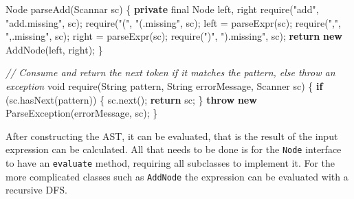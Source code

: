 \documentclass[
]{book}
\newenvironment{Shaded}{\begin{snugshade}}{\end{snugshade}}
\newcommand{\BuiltInTok}[1]{#1}
\newcommand{\CommentTok}[1]{\textcolor[rgb]{0.56,0.35,0.01}{\textit{#1}}}
\newcommand{\DataTypeTok}[1]{\textcolor[rgb]{0.13,0.29,0.53}{#1}}
\newcommand{\FunctionTok}[1]{\textcolor[rgb]{0.00,0.00,0.00}{#1}}
\newcommand{\KeywordTok}[1]{\textcolor[rgb]{0.13,0.29,0.53}{\textbf{#1}}}
\newcommand{\NormalTok}[1]{#1}
\newcommand{\StringTok}[1]{\textcolor[rgb]{0.31,0.60,0.02}{#1}}
\begin{document}
\begin{Shaded}
\begin{Highlighting}[]
\BuiltInTok{Node} \FunctionTok{parseAdd}\NormalTok{(Scannar sc) \{}
  \KeywordTok{private} \DataTypeTok{final} \BuiltInTok{Node}\NormalTok{ left, right}
  \FunctionTok{require}\NormalTok{(}\StringTok{"add"}\NormalTok{, }\StringTok{"add.missing"}\NormalTok{, sc);}
  \FunctionTok{require}\NormalTok{(}\StringTok{"("}\NormalTok{, }\StringTok{"(.missing"}\NormalTok{, sc);}
\NormalTok{  left = }\FunctionTok{parseExpr}\NormalTok{(sc);}
  \FunctionTok{require}\NormalTok{(}\StringTok{","}\NormalTok{, }\StringTok{",.missing"}\NormalTok{, sc);}
\NormalTok{  right = }\FunctionTok{parseExpr}\NormalTok{(sc);}
  \FunctionTok{require}\NormalTok{(}\StringTok{")"}\NormalTok{, }\StringTok{").missing"}\NormalTok{, sc);}
  \KeywordTok{return} \KeywordTok{new} \FunctionTok{AddNode}\NormalTok{(left, right);}
\NormalTok{\}}

\CommentTok{// Consume and return the next token if it matches the pattern, else throw an exception}
\DataTypeTok{void} \FunctionTok{require}\NormalTok{(}\BuiltInTok{String}\NormalTok{ pattern, }\BuiltInTok{String}\NormalTok{ errorMessage, }\BuiltInTok{Scanner}\NormalTok{ sc) \{}
  \KeywordTok{if}\NormalTok{ (sc.}\FunctionTok{hasNext}\NormalTok{(pattern)) \{}
\NormalTok{    sc.}\FunctionTok{next}\NormalTok{();}
    \KeywordTok{return}\NormalTok{ sc;}
\NormalTok{  \}}
  \KeywordTok{throw} \KeywordTok{new} \BuiltInTok{ParseException}\NormalTok{(errorMessage, sc);}
\NormalTok{\}}
\end{Highlighting}
\end{Shaded}

After constructing the AST, it can be evaluated, that is the result of the input expression can be calculated. All that needs to be done is for the \texttt{Node} interface to have an \texttt{evaluate} method, requiring all subclasses to implement it. For the more complicated classes such as \texttt{AddNode} the expression can be evaluated with a recursive DFS.
\end{document}
